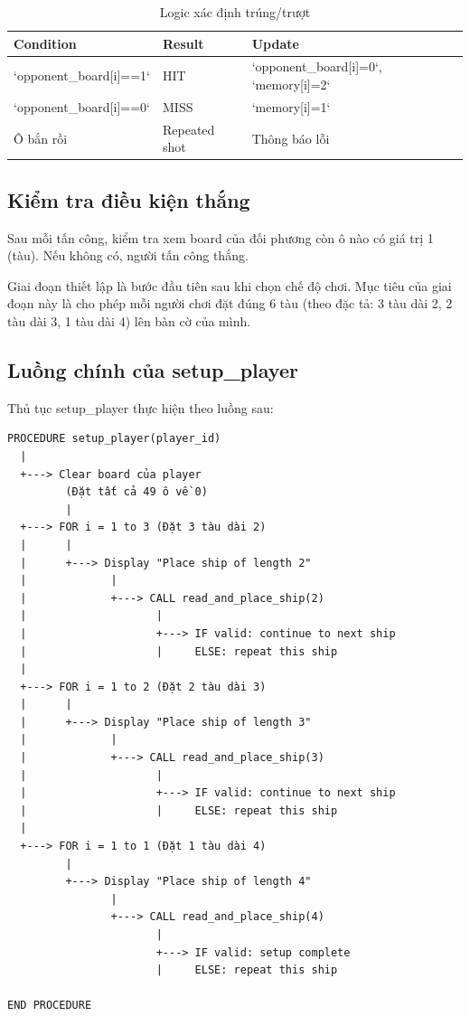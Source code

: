 \begin{table}[H]
\centering
\begin{tabular}{|l|l|l|}
\hline
\textbf{Condition} & \textbf{Result} & \textbf{Update} \\
\hline
`opponent_board[i]==1` & HIT & `opponent_board[i]=0`, `memory[i]=2` \\
\hline
`opponent_board[i]==0` & MISS & `memory[i]=1` \\
\hline
Ô bắn rồi & Repeated shot & Thông báo lỗi \\
\hline
\end{tabular}
\caption{Logic xác định trúng/trượt}
\end{table}

\subsection{Kiểm tra điều kiện thắng}

Sau mỗi tấn công, kiểm tra xem board của đối phương còn ô nào có giá trị 1 (tàu). Nếu không có, người tấn công thắng.

Giai đoạn thiết lập là bước đầu tiên sau khi chọn chế độ chơi. Mục tiêu của giai đoạn này là cho phép mỗi người chơi đặt đúng 6 tàu (theo đặc tả: 3 tàu dài 2, 2 tàu dài 3, 1 tàu dài 4) lên bàn cờ của mình.

\subsection{Luồng chính của setup\_player}

Thủ tục setup\_player thực hiện theo luồng sau:

\begin{verbatim}
PROCEDURE setup_player(player_id)
  |
  +---> Clear board của player
         (Đặt tất cả 49 ô về 0)
         |
  +---> FOR i = 1 to 3 (Đặt 3 tàu dài 2)
  |      |
  |      +---> Display "Place ship of length 2"
  |             |
  |             +---> CALL read_and_place_ship(2)
  |                    |
  |                    +---> IF valid: continue to next ship
  |                    |     ELSE: repeat this ship
  |
  +---> FOR i = 1 to 2 (Đặt 2 tàu dài 3)
  |      |
  |      +---> Display "Place ship of length 3"
  |             |
  |             +---> CALL read_and_place_ship(3)
  |                    |
  |                    +---> IF valid: continue to next ship
  |                    |     ELSE: repeat this ship
  |
  +---> FOR i = 1 to 1 (Đặt 1 tàu dài 4)
         |
         +---> Display "Place ship of length 4"
                |
                +---> CALL read_and_place_ship(4)
                       |
                       +---> IF valid: setup complete
                       |     ELSE: repeat this ship

END PROCEDURE
\end{verbatim}

